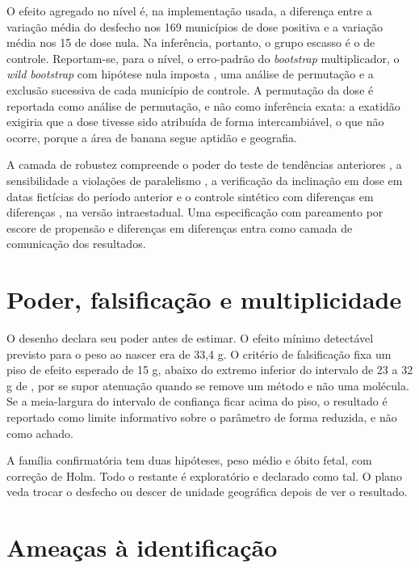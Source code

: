 O efeito agregado no nível é, na implementação usada, a diferença entre a
variação média do desfecho nos 169 municípios de dose positiva e a variação
média nos 15 de dose nula. Na inferência, portanto, o grupo escasso é o de
controle. Reportam-se, para o nível, o erro-padrão do \emph{bootstrap}
multiplicador, o \emph{wild bootstrap} com hipótese nula imposta
\cite{cameron2008wild}, uma análise de permutação e a exclusão sucessiva de
cada município de controle. A permutação da dose é reportada como análise de
permutação, e não como inferência exata: a exatidão exigiria que a dose tivesse
sido atribuída de forma intercambiável, o que não ocorre, porque a área de
banana segue aptidão e geografia. 

A camada de robustez compreende o poder do teste de tendências anteriores
\cite{roth2023trending}, a sensibilidade a violações de paralelismo
\cite{rambachan2023credible}, a verificação da inclinação em dose em datas
fictícias do período anterior e o controle sintético com diferenças em
diferenças \cite{arkhangelsky2021sdid}, na versão intraestadual. Uma
especificação com pareamento por escore de propensão e diferenças em diferenças
\cite{bravoureta2020psmdid} entra como camada de comunicação dos resultados.

\section{Poder, falsificação e multiplicidade}
\label{sec:poder}

O desenho declara seu poder antes de estimar. O efeito mínimo detectável
previsto para o peso ao nascer era de 33,4 g. O critério de falsificação fixa
um piso de efeito esperado de 15 g, abaixo do extremo inferior do intervalo de
23 a 32 g de \citet{reynier2025glyphosate}, por se supor atenuação quando se
remove um método e não uma molécula. Se a meia-largura do intervalo de
confiança ficar acima do piso, o resultado é reportado como limite informativo
sobre o parâmetro de forma reduzida, e não como achado.

A família confirmatória tem duas hipóteses, peso médio e óbito fetal, com
correção de Holm. Todo o restante é exploratório e declarado como tal. O plano
veda trocar o desfecho ou descer de unidade geográfica depois de ver o
resultado.

\section{Ameaças à identificação}
\label{sec:ameacas}

